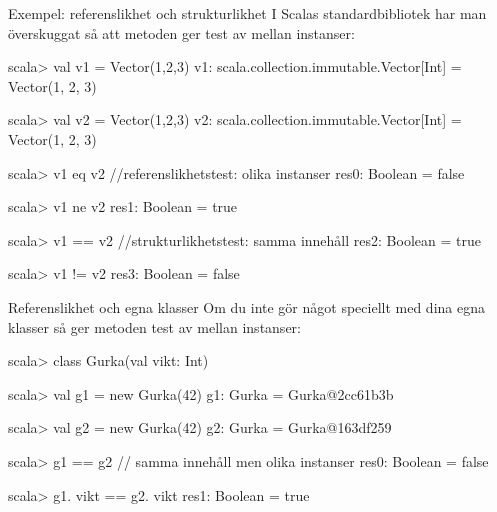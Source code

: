 \begin{Slide}{Exempel: referenslikhet och strukturlikhet}
I Scalas standardbibliotek har man överskuggat  så att metoden \code{==} ger test av  mellan instanser:
\begin{REPL}
scala> val v1 = Vector(1,2,3)
v1: scala.collection.immutable.Vector[Int] = Vector(1, 2, 3)

scala> val v2 = Vector(1,2,3)
v2: scala.collection.immutable.Vector[Int] = Vector(1, 2, 3)

scala> v1 eq v2                //referenslikhetstest: olika instanser
res0: Boolean = false

scala> v1 ne v2
res1: Boolean = true

scala> v1 == v2                //strukturlikhetstest: samma innehåll
res2: Boolean = true

scala> v1 != v2
res3: Boolean = false
\end{REPL}
\end{Slide}


\begin{Slide}{Referenslikhet och egna klasser}
Om du inte gör något speciellt med dina egna klasser så ger metoden \code{==} test av  mellan instanser:
\begin{REPLnonum}
scala> class Gurka(val vikt: Int)

scala> val g1 = new Gurka(42)
g1: Gurka = Gurka@2cc61b3b

scala> val g2 = new Gurka(42)
g2: Gurka = Gurka@163df259

scala> g1 == g2       // samma innehåll men olika instanser
res0: Boolean = false

scala> g1. vikt == g2. vikt
res1: Boolean = true
\end{REPLnonum}
\end{Slide}

\fi

